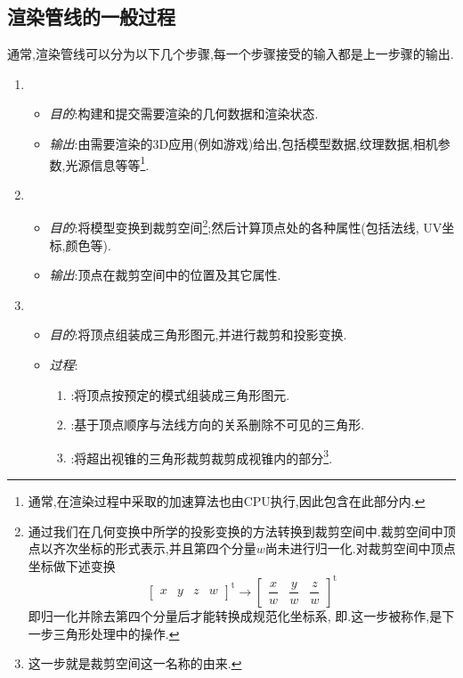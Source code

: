 \documentclass{ctexart}
\begin{document}
\subsection{渲染管线的一般过程}
通常,渲染管线可以分为以下几个步骤,每一个步骤接受的输入都是上一步骤的输出.
\begin{enumerate}
    \item {}
    \begin{itemize}
        \item \textit{目的}:构建和提交需要渲染的几何数据和渲染状态.
        \item \textit{输出}:由需要渲染的3D应用(例如游戏)给出,包括模型数据,纹理数据,相机参数,光源信息等等\footnote{通常,在渲染过程中采取的加速算法也由CPU执行,因此包含在此部分内.}.
    \end{itemize}
    \item {}
    \begin{itemize}
        \item \textit{目的}:将模型变换到裁剪空间\footnote{通过我们在几何变换中所学的投影变换的方法转换到裁剪空间中.裁剪空间中顶点以齐次坐标的形式表示,并且第四个分量$w$尚未进行归一化.对裁剪空间中顶点坐标做下述变换
        \[\begin{bmatrix}
            x&y&z&w
        \end{bmatrix}^{\text{t}}\longrightarrow\begin{bmatrix}
            \dfrac xw&\dfrac yw&\dfrac zw
        \end{bmatrix}^{\text{t}}\]
        即归一化并除去第四个分量后才能转换成规范化坐标系, 即.这一步被称作,是下一步三角形处理中的操作.};然后计算顶点处的各种属性(包括法线, UV坐标,颜色等).
        \item \textit{输出}:顶点在裁剪空间中的位置及其它属性.
    \end{itemize}
    \item {}
    \begin{itemize}
        \item \textit{目的}:将顶点组装成三角形图元,并进行裁剪和投影变换.
        \item \textit{过程}:\begin{enumerate}[label=\tbf{\alph*.}]
            \item {}:将顶点按预定的模式组装成三角形图元.
            \item {}:基于顶点顺序与法线方向的关系删除不可见的三角形.
            \item {}:将超出视锥的三角形裁剪裁剪成视锥内的部分\footnote{这一步就是裁剪空间这一名称的由来.}.

\end{enumerate}
\end{itemize}
\end{enumerate}
\end{document}
